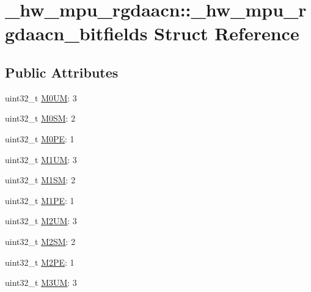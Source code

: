 \hypertarget{struct__hw__mpu__rgdaacn_1_1__hw__mpu__rgdaacn__bitfields}{}\section{\+\_\+hw\+\_\+mpu\+\_\+rgdaacn\+:\+:\+\_\+hw\+\_\+mpu\+\_\+rgdaacn\+\_\+bitfields Struct Reference}
\label{struct__hw__mpu__rgdaacn_1_1__hw__mpu__rgdaacn__bitfields}
\subsection*{Public Attributes}
\begin{DoxyCompactItemize}
\item 
uint32\+\_\+t \hyperlink{struct__hw__mpu__rgdaacn_1_1__hw__mpu__rgdaacn__bitfields_a1c19f27a39695412159b8c9e676a2ee8}{M0\+UM}\+: 3
\item 
uint32\+\_\+t \hyperlink{struct__hw__mpu__rgdaacn_1_1__hw__mpu__rgdaacn__bitfields_a10c17c9988e842fd22c98c31f6e73b62}{M0\+SM}\+: 2
\item 
uint32\+\_\+t \hyperlink{struct__hw__mpu__rgdaacn_1_1__hw__mpu__rgdaacn__bitfields_a92cd1a6c7fc11890c52658990dc64e6a}{M0\+PE}\+: 1
\item 
uint32\+\_\+t \hyperlink{struct__hw__mpu__rgdaacn_1_1__hw__mpu__rgdaacn__bitfields_a93541451f8f786395a8e70414f1e9ddf}{M1\+UM}\+: 3
\item 
uint32\+\_\+t \hyperlink{struct__hw__mpu__rgdaacn_1_1__hw__mpu__rgdaacn__bitfields_a50fdba77fae7d8abbfef0d74db854a2e}{M1\+SM}\+: 2
\item 
uint32\+\_\+t \hyperlink{struct__hw__mpu__rgdaacn_1_1__hw__mpu__rgdaacn__bitfields_a5317c413e9cc36f79df5c901ae7a3a8b}{M1\+PE}\+: 1
\item 
uint32\+\_\+t \hyperlink{struct__hw__mpu__rgdaacn_1_1__hw__mpu__rgdaacn__bitfields_a41f7aec94e426c6325d17a3a2482e123}{M2\+UM}\+: 3
\item 
uint32\+\_\+t \hyperlink{struct__hw__mpu__rgdaacn_1_1__hw__mpu__rgdaacn__bitfields_a64277c6e7d8de2d2d7e1a154df13b366}{M2\+SM}\+: 2
\item 
uint32\+\_\+t \hyperlink{struct__hw__mpu__rgdaacn_1_1__hw__mpu__rgdaacn__bitfields_aa6b0e59c23562158e6f41ddee9626edd}{M2\+PE}\+: 1
\item 
uint32\+\_\+t \hyperlink{struct__hw__mpu__rgdaacn_1_1__hw__mpu__rgdaacn__bitfields_acb4a275665be55d793b72cb1bdfd932c}{M3\+UM}\+: 3

\end{DoxyCompactItemize}
